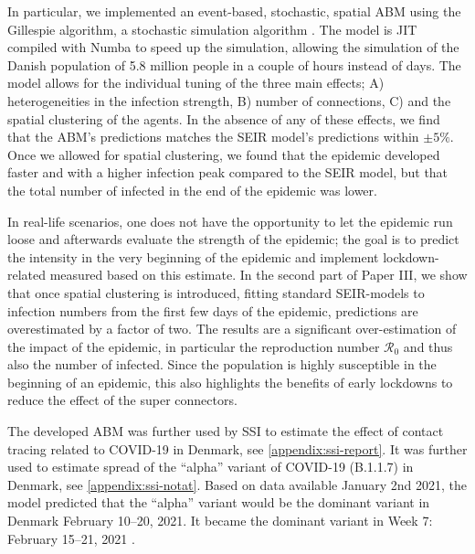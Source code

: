 In particular, we implemented an event-based, stochastic, spatial ABM using the Gillespie algorithm, a stochastic simulation algorithm \autocite{gillespieExactStochasticSimulation1977}. The model is JIT compiled with Numba \autocite{lamNumbaLLVMbasedPython2015} to speed up the simulation, allowing the simulation of the Danish population of 5.8 million people in a couple of hours instead of days. The model allows for the individual tuning of the three main effects; A) heterogeneities in the infection strength, B) number of connections, C) and the spatial clustering of the agents. In the absence of any of these effects, we find that the ABM's predictions matches the SEIR model's predictions within $\pm 5 \%$. Once we allowed for spatial clustering, we found that the epidemic developed faster and with a higher infection peak compared to the SEIR model, but that the total number of infected in the end of the epidemic was lower.

In real-life scenarios, one does not have the opportunity to let the epidemic run loose and afterwards evaluate the strength of the epidemic; the goal is to predict the intensity in the very beginning of the epidemic and implement lockdown-related measured based on this estimate. In the second part of Paper III, we show that once spatial clustering is introduced, fitting standard SEIR-models to infection numbers from the first few days of the epidemic, predictions are overestimated by a factor of two. The results are a significant over-estimation of the impact of the epidemic, in particular the reproduction number $\mathcal{R}_0$ and thus also the number of infected. Since the population is highly susceptible in the beginning of an epidemic, this also highlights the benefits of early lockdowns to reduce the effect of the super connectors.


The developed ABM was further used by SSI to estimate the effect of contact tracing related to COVID-19 in Denmark, see \autoref{appendix:ssi-report}. It was further used to estimate spread of the ``alpha'' variant of COVID-19 (B.1.1.7) in Denmark, see \autoref{appendix:ssi-notat}. Based on data available January 2nd 2021, the model predicted that the ``alpha'' variant would be the dominant variant in Denmark February 10--20, 2021. It became the dominant variant in Week 7: February 15--21, 2021 \autocite{bagerRiskHospitalisationAssociated2021}.

